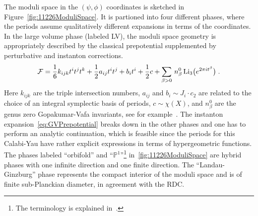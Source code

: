\documentclass[11pt,a4paper]{article}
\numberwithin{equation}{section}
\numberwithin{table}{section}\setlength{\multlinegap}{25pt}
\begin{document}
The moduli space in the $(\psi,\phi)$ coordinates is sketched in Figure~\ref{fig:11226ModuliSpace}. It is partioned into four different phases, where the periods assume qualitatively different expansions in terms of the coordinates. In the large volume phase (labeled LV), the moduli space geometry is appropriately described by the classical prepotential supplemented by perturbative and instanton corrections.
\begin{equation}
    \label{eq:GVPrepotential}
    \mathcal{F}=\frac16 k_{ijk}t^i t^j t^k+\frac12 a_{ij}t^i t^j+b_i t^i+\frac12 c+\sum_{\beta>0}\,n_{\beta}^0\,\textup{Li}_3\big(e^{2\pi i t^\beta}\big)\;.
\end{equation}
Here $k_{ijk}$ are the triple intersection numbers, $a_{ij}$ and $b_i\sim J_i\cdot c_2$ are related to the choice of an integral symplectic basis of periods, $c\sim\chi(X)$, and $n_\beta^0$ are the genus zero Gopakumar-Vafa invariants, see for example~\cite{Hosono:1994ax,Hori:2003ic}. The instanton expansion~\eqref{eq:GVPrepotential} breaks down in the other phases and one has to perform an analytic continuation, which is feasible since the periods for this Calabi-Yau have rather explicit expressions in terms of hypergeometric functions. The phases labeled ``orbifold'' and ``$\mathbb{P}^1$''\footnote{The terminology is explained in~\cite{Blumenhagen:2018nts}.} in~\ref{fig:11226ModuliSpace} are hybrid phases with one infinite direction and one finite direction. The ``Landau-Ginzburg'' phase represents the compact interior of the moduli space and is of finite sub-Planckian diameter, in agreement with the RDC.
\end{document}
